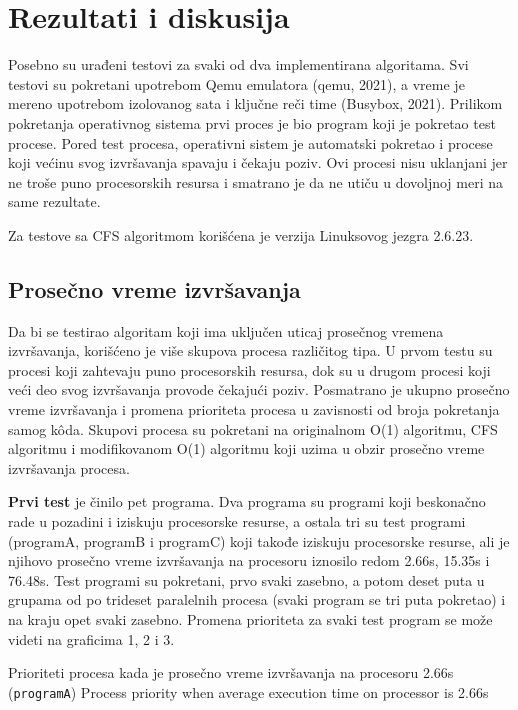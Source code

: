 \section{Rezultati i diskusija}

Posebno su urađeni testovi za svaki od dva implementirana algoritama. Svi testovi su pokretani upotrebom Qemu emulatora (qemu, 2021), a vreme je mereno upotrebom izolovanog sata i ključne reči time (Busybox, 2021). Prilikom pokretanja operativnog sistema prvi proces je bio program koji je pokretao test procese. Pored test procesa, operativni sistem je automatski pokretao i procese koji većinu svog izvršavanja spavaju i čekaju poziv. Ovi procesi nisu uklanjani jer ne troše puno procesorskih resursa i smatrano je da ne utiču u dovoljnoj meri na same rezultate.

Za testove sa CFS algoritmom korišćena je verzija Linuksovog jezgra 2.6.23.

\subsection{Prosečno vreme izvršavanja}

Da bi se testirao algoritam koji ima uključen uticaj prosečnog vremena izvršavanja, korišćeno je više skupova procesa različitog tipa. U prvom testu su procesi koji zahtevaju puno procesorskih resursa, dok su u drugom procesi koji veći deo svog izvršavanja provode čekajući poziv. Posmatrano je ukupno prosečno vreme izvršavanja i promena prioriteta procesa u zavisnosti od broja pokretanja samog kôda. Skupovi procesa su pokretani na originalnom O(1) algoritmu, CFS algoritmu i modifikovanom O(1) algoritmu koji uzima u obzir prosečno vreme izvršavanja procesa.

\textbf{Prvi test} je činilo pet programa. Dva programa su programi koji beskonačno rade u pozadini i iziskuju procesorske resurse, a ostala tri su test programi (programA, programB i programC) koji takođe iziskuju procesorske resurse, ali je njihovo prosečno vreme izvršavanja na procesoru iznosilo redom 2.66s, 15.35s i 76.48s. Test programi su pokretani, prvo svaki zasebno, a potom deset puta u grupama od po trideset paralelnih procesa (svaki program se tri puta pokretao) i na kraju opet svaki zasebno. Promena prioriteta za svaki test program se može videti na graficima 1, 2 i 3. 



    {Prioriteti procesa kada je prosečno vreme izvršavanja na procesoru 2.66s (\texttt{programA})}
    {Process priority when average execution time on processor is 2.66s}



